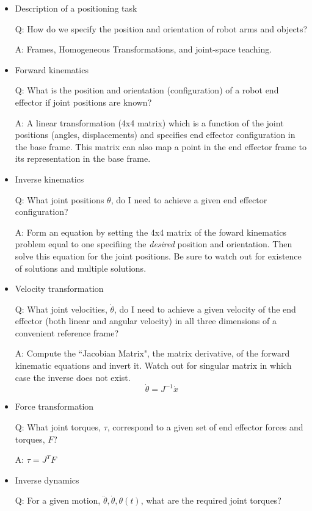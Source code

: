 \begin{itemize}
	\item Description of a positioning task

Q:  How do we specify the position and orientation of robot arms and objects?

A: Frames, Homogeneous Transformations, and joint-space teaching.

	\item Forward kinematics

Q: What is the position and orientation (configuration) of a robot end effector if joint positions are known?

A: A linear transformation (4x4 matrix) which is a function of the joint positions (angles, displacements) and specifies end effector configuration in the base frame.  This matrix can also map a point in the end effector frame to its representation in the base frame. 

	\item Inverse kinematics

Q: What joint positions $\theta$, do I need to achieve a given end effector configuration?

A: Form an equation by setting the 4x4 matrix of the foward kinematics problem equal to one specifiing the {\it desired} position and orientation.  Then solve this equation for the joint positions.   Be sure to watch out for existence of solutions and multiple solutions. 


	\item Velocity transformation


Q:  What joint velocities, $\dot{\theta}$, do I need to achieve a given velocity of the end effector (both linear and angular velocity) in all three dimensions of a convenient reference frame?

A: Compute the ``Jacobian Matrix", the matrix derivative, of the forward kinematic equations and invert it.   Watch out for singular matrix in which case the inverse does not exist.
\[
\dot{\theta} = J^{-1} \dot{x}
\]
 
	\item Force transformation

Q:  What joint torques, $\tau$, correspond to a given set of end effector forces and torques, $F$?

A: $\tau = J^T F$
 
	\item Inverse dynamics

Q: For a given motion, $\ddot{\theta}, \dot{\theta}, \theta(t)$, what are the required joint torques?



\end{itemize}
